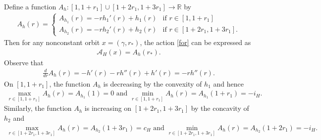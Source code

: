\documentclass[12pt]{amsart}
\theoremstyle{definition}
\newcommand{\RR}{{\mathbb R}}
\begin{document}
\vspace{0.2 cm}

Define a function $A_h : [1, 1+r_1] \cup[1+2r_1, 1+3r_1]  \to \RR$ by
\begin{align*}
    A_h(r) =
    \begin{cases}
        A_{h_1}(r) = -r h_1'(r) + h_1(r)&\textrm{if}\,\,r \in [1,1+r_1]\\
        A_{h_2}(r) = -r h_2'(r) + h_2(r)&\textrm{if}\,\,r \in [1+2r_1,1+3r_1].
    \end{cases}
    \end{align*}
    Then for any nonconstant orbit $x=(\gamma,r_*)$, the action \eqref{for} can be expressed as
   \begin{align*}
       \mathcal{A}_H(x) = A_h(r_*).
   \end{align*}
   Observe that 
   \begin{align}\label{mi}
       \frac{d}{dr} A_h (r)=  -h'(r) -r h''(r) +h'(r) = -r h''(r).
   \end{align}
    On $[1, 1+r_1]$, the function $A_h$ is decreasing by the convexity of $h_1$ and hence
\begin{align*}
    \max_{r \in [1, 1+r_1]} A_h(r) = A_{h_1}(1) = 0 \,\,\text{and}\,\, \min_{r \in [1, 1+r_1]}A_h(r) = A_{h_1}\left(1+r_1\right) = -i_H.
\end{align*}
Similarly, the function $A_h$ is increasing on $[1+2r_1,1+3r_1]$ by the concavity of $h_2$ and 
\begin{align*}
    \max_{r \in [1+2r_1,1+3r_1]} A_h(r) = A_{h_2}(1+3r_1) = c_H  \,\,\text{and}\,\,\min_{r \in [1+2r_1,1+3r_1]} A_h(r) = A_{h_2}\left(1+2r_1 \right) = -i_H.
\end{align*}


\vspace{0.2cm}
\end{document}
